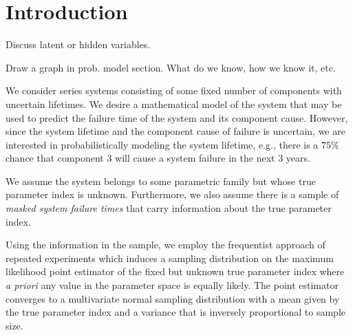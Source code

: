 \documentclass[../main.tex]{subfiles}
\begin{document}
\chapter{Introduction}
\label{sec:intro}
Discuss latent or hidden variables.

Draw a graph in prob. model section. What do we know, how we know it, etc.


We consider series systems consisting of some fixed number of components with 
uncertain lifetimes. We desire a mathematical model of the system that may be 
used to predict the failure time of the system and its component cause. 
However, since the system lifetime and the component cause of failure is 
uncertain, we are interested in probabilistically modeling the system lifetime, 
e.g., there is a $75\%$ chance that component $3$ will cause a system failure 
in the next $3$ years.

We assume the system belongs to some parametric family but whose true parameter 
index is unknown. Furthermore, we also assume there is a sample of 
\emph{masked system failure times} that carry information about the true 
parameter index.

Using the information in the sample, we employ the frequentist approach of 
repeated experiments which induces a sampling distribution on the maximum 
likelihood point estimator of the fixed but unknown true parameter index where 
\emph{a priori} any value in the parameter space is equally likely. The point 
estimator converges to a multivariate normal sampling distribution with a mean 
given by the true parameter index and a variance that is inversely proportional 
to sample size.
\end{document}
